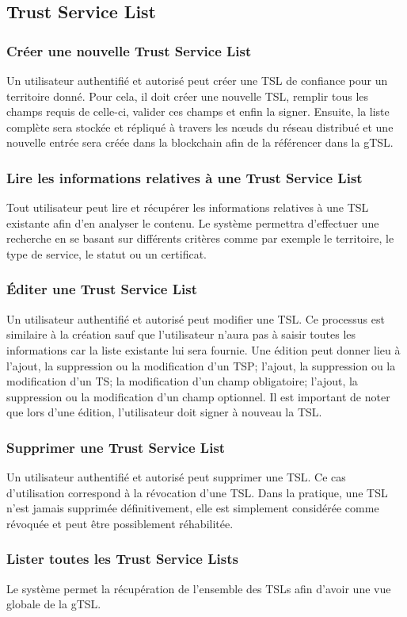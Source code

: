 \documentclass{tnreport}
\begin{document}
\subsection{Trust Service List}
\subsubsection{Créer une nouvelle Trust Service List}
Un utilisateur authentifié et autorisé peut créer une TSL de confiance pour un territoire donné. Pour cela, il doit créer une nouvelle TSL, remplir tous les champs requis de celle-ci, valider ces champs et enfin la signer. Ensuite, la liste complète sera stockée et répliqué à travers les nœuds du réseau distribué et une nouvelle entrée sera créée dans la blockchain afin de la référencer dans la gTSL.
\subsubsection{Lire les informations relatives à une Trust Service List}
Tout utilisateur peut lire et récupérer les informations relatives à une TSL existante afin d'en analyser le contenu. Le système permettra d'effectuer une recherche en se basant sur différents critères comme par exemple le territoire, le type de service, le statut ou un certificat.
\subsubsection{Éditer une Trust Service List}
Un utilisateur authentifié et autorisé peut modifier une TSL. Ce processus est similaire à la création sauf que l'utilisateur n'aura pas à saisir toutes les informations car la liste existante lui sera fournie. Une édition peut donner lieu à l'ajout, la suppression ou la modification d'un TSP; l'ajout, la suppression ou la modification d'un TS; la modification d'un champ obligatoire; l'ajout, la suppression ou la modification d'un champ optionnel. Il est important de noter que lors d'une édition, l'utilisateur doit signer à nouveau la TSL.
\subsubsection{Supprimer une Trust Service List}
Un utilisateur authentifié et autorisé peut supprimer une TSL. Ce cas d'utilisation correspond à la révocation d'une TSL. Dans la pratique, une TSL n'est jamais supprimée définitivement, elle est simplement considérée comme révoquée et peut être possiblement réhabilitée.
\subsubsection{Lister toutes les Trust Service Lists}
Le système permet la récupération de l'ensemble des TSLs afin d'avoir une vue globale de la gTSL.
\end{document}
